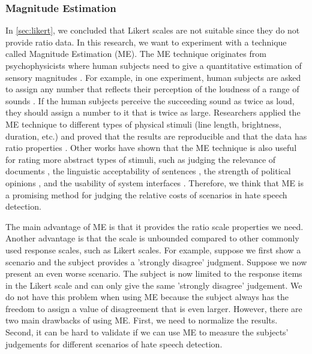 \documentclass[a4paper]{article}
\begin{document}
\subsubsection{Magnitude Estimation}
\label{sec:me}
In \ref{sec:likert}, we concluded that Likert scales are not suitable since they do not provide ratio data. In this research, we want to experiment with a technique called Magnitude Estimation (ME). The ME technique originates from psychophysicists where human subjects need to give a quantitative estimation of sensory magnitudes \cite{stevens1956direct}. For example, in one experiment, human subjects are asked to assign any number that reflects their perception of the loudness of a range of sounds \cite{stevens1956direct}. If the human subjects perceive the succeeding sound as twice as loud, they should assign a number to it that is twice as large. Researchers applied the ME technique to different types of physical stimuli (line length, brightness, duration, etc.) and proved that the results are reproducible and that the data has ratio properties \cite{moskowitz1977magnitude}. Other works have shown that the ME technique is also useful for rating more abstract types of stimuli, such as judging the relevance of documents \cite{maddalena2017crowdsourcing}, the linguistic acceptability of sentences \cite{bard1996magnitude}, the strength of political opinions \cite{lodge1979comparisons, lodge1976calibration}, and the usability of system interfaces \cite{mcgee2004master}. Therefore, we think that ME is a promising method for judging the relative costs of scenarios in hate speech detection.

The main advantage of ME is that it provides the ratio scale properties we need. Another advantage is that the scale is unbounded compared to other commonly used response scales, such as Likert scales. For example, suppose we first show a scenario and the subject provides a 'strongly disagree' judgment. Suppose we now present an even worse scenario. The subject is now limited to the response items in the Likert scale and can only give the same 'strongly disagree' judgement. We do not have this problem when using ME because the subject always has the freedom to assign a value of disagreement that is even larger. However, there are two main drawbacks of using ME. First, we need to normalize the results. Second, it can be hard to validate if we can use ME to measure the subjects' judgements for different scenarios of hate speech detection.
\end{document}
